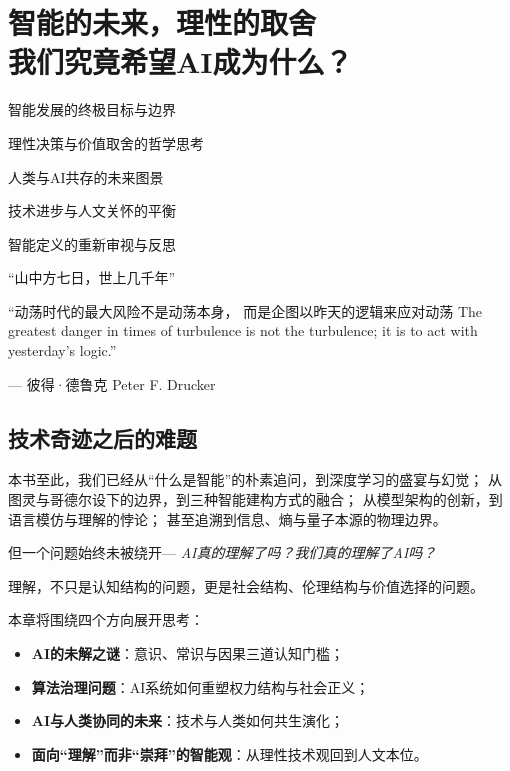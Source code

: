 \chapter{智能的未来，理性的取舍\texorpdfstring{\\}{ }我们究竟希望AI成为什么？}

 \begin{introduction}
  \item 智能发展的终极目标与边界
  \item 理性决策与价值取舍的哲学思考
  \item 人类与AI共存的未来图景
  \item 技术进步与人文关怀的平衡
  \item 智能定义的重新审视与反思
\end{introduction}

“山中方七日，世上几千年”

“动荡时代的最大风险不是动荡本身， 而是企图以昨天的逻辑来应对动荡
The greatest danger in times of turbulence is not the turbulence; it is to act with yesterday’s logic.”
\begin{flushright}
— 彼得·德鲁克 Peter F. Drucker
\end{flushright}


\section*{技术奇迹之后的难题}

本书至此，我们已经从“什么是智能”的朴素追问，到深度学习的盛宴与幻觉；  
从图灵与哥德尔设下的边界，到三种智能建构方式的融合；  
从模型架构的创新，到语言模仿与理解的悖论；  
甚至追溯到信息、熵与量子本源的物理边界。


但一个问题始终未被绕开--- \textit{AI真的理解了吗？我们真的理解了AI吗？}

理解，不只是认知结构的问题，更是社会结构、伦理结构与价值选择的问题。

本章将围绕四个方向展开思考：

\begin{itemize}
\item \textbf{AI的未解之谜}：意识、常识与因果三道认知门槛；
\item \textbf{算法治理问题}：AI系统如何重塑权力结构与社会正义；
\item \textbf{AI与人类协同的未来}：技术与人类如何共生演化；
\item \textbf{面向“理解”而非“崇拜”的智能观}：从理性技术观回到人文本位。
\end{itemize}

